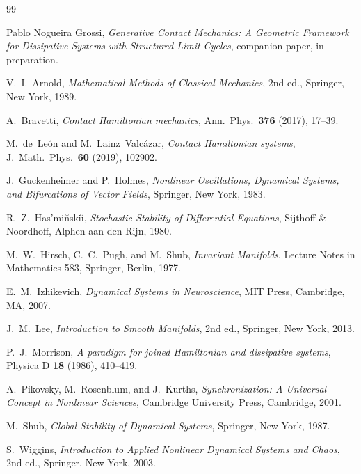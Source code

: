 \documentclass[reqno]{amsart}
\numberwithin{equation}{section}
\theoremstyle{plain}
\theoremstyle{definition}
\theoremstyle{remark}
\begin{document}
\begin{thebibliography}{99}

Pablo Nogueira Grossi,
\emph{Generative Contact Mechanics: A Geometric Framework for
Dissipative Systems with Structured Limit Cycles},
companion paper, in preparation.

V.~I.~Arnold,
\emph{Mathematical Methods of Classical Mechanics},
2nd ed., Springer, New York, 1989.

A.~Bravetti,
\emph{Contact Hamiltonian mechanics},
Ann.\ Phys.\ \textbf{376} (2017), 17--39.

M.~de~Le{\'o}n and M.~Lainz~Valc{\'a}zar,
\emph{Contact Hamiltonian systems},
J.\ Math.\ Phys.\ \textbf{60} (2019), 102902.

J.~Guckenheimer and P.~Holmes,
\emph{Nonlinear Oscillations, Dynamical Systems, and Bifurcations
of Vector Fields},
Springer, New York, 1983.

R.~Z.~Has{'}mi{\u{n}}ski{\u{\i}},
\emph{Stochastic Stability of Differential Equations},
Sijthoff \& Noordhoff, Alphen aan den Rijn, 1980.

M.~W.~Hirsch, C.~C.~Pugh, and M.~Shub,
\emph{Invariant Manifolds},
Lecture Notes in Mathematics 583, Springer, Berlin, 1977.

E.~M.~Izhikevich,
\emph{Dynamical Systems in Neuroscience},
MIT Press, Cambridge, MA, 2007.

J.~M.~Lee,
\emph{Introduction to Smooth Manifolds},
2nd ed., Springer, New York, 2013.

P.~J.~Morrison,
\emph{A paradigm for joined Hamiltonian and dissipative systems},
Physica D \textbf{18} (1986), 410--419.

A.~Pikovsky, M.~Rosenblum, and J.~Kurths,
\emph{Synchronization: A Universal Concept in Nonlinear Sciences},
Cambridge University Press, Cambridge, 2001.

M.~Shub,
\emph{Global Stability of Dynamical Systems},
Springer, New York, 1987.

S.~Wiggins,
\emph{Introduction to Applied Nonlinear Dynamical Systems and Chaos},
2nd ed., Springer, New York, 2003.

\end{thebibliography}
\end{document}
